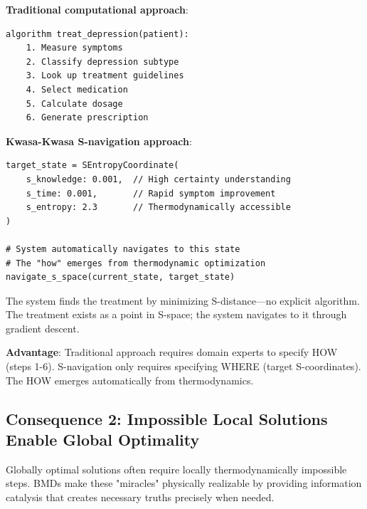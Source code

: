 \begin{example}
\textbf{Traditional computational approach}:
\begin{verbatim}
algorithm treat_depression(patient):
    1. Measure symptoms
    2. Classify depression subtype
    3. Look up treatment guidelines
    4. Select medication
    5. Calculate dosage
    6. Generate prescription
\end{verbatim}

\textbf{Kwasa-Kwasa S-navigation approach}:
\begin{verbatim}
target_state = SEntropyCoordinate(
    s_knowledge: 0.001,  // High certainty understanding
    s_time: 0.001,       // Rapid symptom improvement
    s_entropy: 2.3       // Thermodynamically accessible
)

# System automatically navigates to this state
# The "how" emerges from thermodynamic optimization
navigate_s_space(current_state, target_state)
\end{verbatim}

The system finds the treatment by minimizing S-distance—no explicit algorithm. The treatment exists as a point in S-space; the system navigates to it through gradient descent.

\textbf{Advantage}: Traditional approach requires domain experts to specify HOW (steps 1-6). S-navigation only requires specifying WHERE (target S-coordinates). The HOW emerges automatically from thermodynamics.
\end{example}



\subsection{Consequence 2: Impossible Local Solutions Enable Global Optimality}

\begin{theorem}
\label{thm:necessity_of_miracles}
Globally optimal solutions often require locally thermodynamically impossible steps. BMDs make these "miracles" physically realizable by providing information catalysis that creates necessary truths precisely when needed.
\end{theorem}


